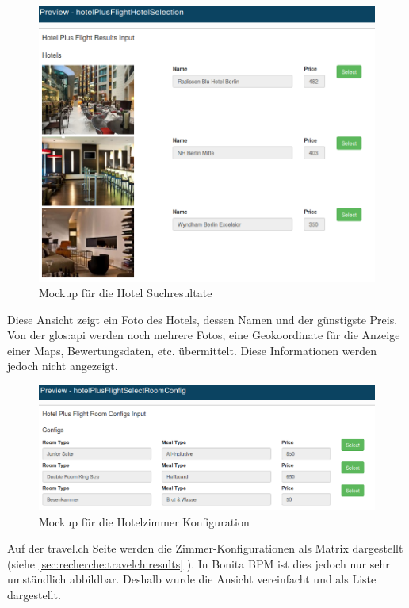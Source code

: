 \begin{figure}[H]
	\centering
	\includegraphics[width=1\textwidth]{images/forms-select-hotel.png}
	\caption{Mockup für die Hotel Suchresultate}
	\label{fig:konzept:mockups:selecthotel}
\end{figure}
Diese Ansicht zeigt ein Foto des Hotels, dessen Namen und der günstigste Preis. Von der \Gls{glos:api} werden noch mehrere Fotos, eine Geokoordinate für die Anzeige einer Maps, Bewertungsdaten, etc. übermittelt. Diese Informationen werden jedoch nicht angezeigt.

\begin{figure}[H]
	\centering
	\includegraphics[width=1\textwidth]{images/forms-select-roomconfig.png}
	\caption{Mockup für die Hotelzimmer Konfiguration}
	\label{fig:konzept:mockups:selectroomconfig}
\end{figure}
Auf der travel.ch Seite werden die Zimmer-Konfigurationen als Matrix dargestellt (siehe \cref{sec:recherche:travelch:results} ). In Bonita BPM ist dies jedoch nur sehr umständlich abbildbar. Deshalb wurde die Ansicht vereinfacht und als Liste dargestellt.

